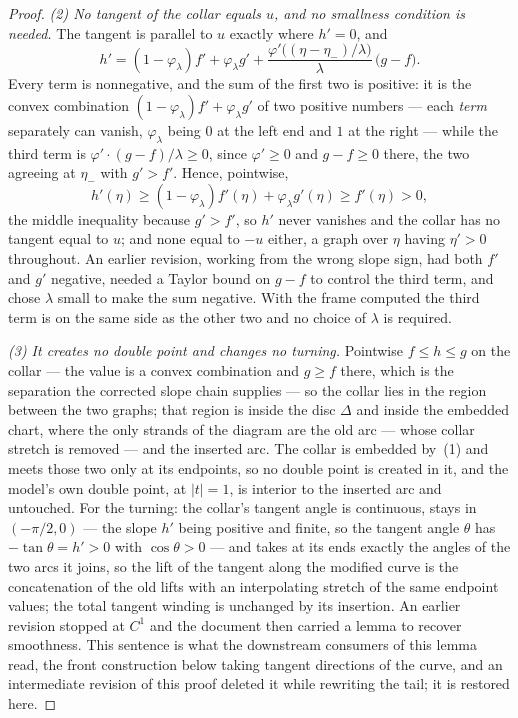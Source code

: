 \begin{proof}
\emph{(2) No tangent of the collar equals $u$, and no smallness condition is
needed.} The tangent is parallel to $u$ exactly where $h'=0$, and
\[
   h'=(1-\varphi_\lambda)f'+\varphi_\lambda g'
      +\frac{\varphi'\bigl((\eta-\eta_-)/\lambda\bigr)}{\lambda}\,
       \bigl(g-f\bigr).
\]
Every term is nonnegative, and the sum of the first two is positive: it is the
convex combination $(1-\varphi_\lambda)f'+\varphi_\lambda g'$ of two positive
numbers --- each \emph{term} separately can vanish, $\varphi_\lambda$ being $0$
at the left end and $1$ at the right --- while the third term is
$\varphi'\cdot(g-f)/\lambda\geq0$, since $\varphi'\geq0$ and $g-f\geq0$ there,
the two agreeing at $\eta_-$ with $g'>f'$. Hence, pointwise,
\[
   h'(\eta)\geq(1-\varphi_\lambda)f'(\eta)+\varphi_\lambda g'(\eta)
   \geq f'(\eta)>0 ,
\]
the middle inequality because $g'>f'$, so $h'$ never vanishes and the collar
has no tangent equal to $u$; and none equal to $-u$ either, a graph over $\eta$ having
$\eta'>0$ throughout. An earlier revision, working from the wrong slope sign,
had both $f'$ and $g'$ negative, needed a Taylor bound on $g-f$ to control the
third term, and chose $\lambda$ small to make the sum negative. With the frame
computed the third term is on the same side as the other two and no choice of
$\lambda$ is required.

\emph{(3) It creates no double point and changes no turning.} Pointwise
$f\leq h\leq g$ on the collar --- the value is a convex combination and $g\geq f$
there, which is the separation the corrected slope chain supplies --- so the
collar lies in the region between the two graphs; that region is inside the
disc $\Delta$ and inside the embedded chart, where the only strands of the
diagram are the old arc --- whose collar stretch is removed --- and the inserted
arc. The collar is embedded by~(1) and meets those two only at its endpoints,
so no double point is created in it, and the model's own double point, at
$|t|=1$, is interior to the inserted arc and untouched. For the turning: the
collar's tangent angle is continuous, stays in $(-\pi/2,0)$ --- the slope
$h'$ being positive and finite, so the tangent angle $\theta$ has
$-\tan\theta=h'>0$ with $\cos\theta>0$ --- and takes at its ends exactly the
angles of the two arcs it joins, so the lift of the tangent
along the modified curve is the concatenation of the old lifts with an
interpolating stretch of the same endpoint values; the total tangent winding is
unchanged by its insertion. An earlier revision stopped at $C^1$
and the document then carried a lemma to recover smoothness. This sentence is what the downstream consumers of this
lemma read, the front construction below taking tangent directions of the
curve, and an intermediate revision of this proof deleted it while rewriting
the tail; it is restored here.


\end{proof}
